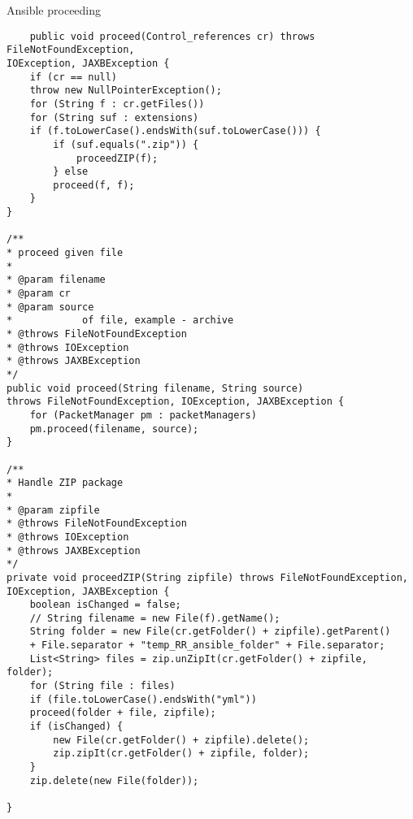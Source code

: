 \begin{Listing}
\caption{Ansible proceeding}
\label{lst:ansible_proceed}
\begin{lstlisting}
	public void proceed(Control_references cr) throws FileNotFoundException,
IOException, JAXBException {
	if (cr == null)
	throw new NullPointerException();
	for (String f : cr.getFiles())
	for (String suf : extensions)
	if (f.toLowerCase().endsWith(suf.toLowerCase())) {
		if (suf.equals(".zip")) {
			proceedZIP(f);
		} else
		proceed(f, f);
	}
}

/**
* proceed given file
* 
* @param filename
* @param cr
* @param source
*            of file, example - archive
* @throws FileNotFoundException
* @throws IOException
* @throws JAXBException
*/
public void proceed(String filename, String source)
throws FileNotFoundException, IOException, JAXBException {
	for (PacketManager pm : packetManagers)
	pm.proceed(filename, source);
}

/**
* Handle ZIP package
* 
* @param zipfile
* @throws FileNotFoundException
* @throws IOException
* @throws JAXBException
*/
private void proceedZIP(String zipfile) throws FileNotFoundException,
IOException, JAXBException {
	boolean isChanged = false;
	// String filename = new File(f).getName();
	String folder = new File(cr.getFolder() + zipfile).getParent()
	+ File.separator + "temp_RR_ansible_folder" + File.separator;
	List<String> files = zip.unZipIt(cr.getFolder() + zipfile, folder);
	for (String file : files)
	if (file.toLowerCase().endsWith("yml"))
	proceed(folder + file, zipfile);
	if (isChanged) {
		new File(cr.getFolder() + zipfile).delete();
		zip.zipIt(cr.getFolder() + zipfile, folder);
	}
	zip.delete(new File(folder));
	
}
\end{lstlisting}
\end{Listing}